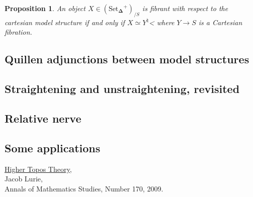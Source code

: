 \documentclass{amsart}
\newcommand{\8}{\ensuremath{\infty}}
\newcommand{\SSet}{\ensuremath{\text{Set}_{\boldsymbol{\Delta}}}}
\newtheorem{proposition}{Proposition}
\begin{document}
\begin{proposition}
  An object $X\in(\SSet^+)_{/S}$ is fibrant with respect to the cartesian model structure if and only if $X\simeq Y^\natural$< where $Y\rightarrow S$ is a Cartesian fibration.
\end{proposition}

\subsection{Quillen adjunctions between model structures}
\subsection{Straightening and unstraightening, revisited}
\subsection{Relative nerve}
\subsection{Some applications}


\begin{thebibliography}{99}
  \href{https://arxiv.org/abs/math/0608040}{Higher Topos Theory}, \\
  Jacob Lurie, \\
  Annals of Mathematics Studies, Number 170, 2009.
\end{thebibliography}
\end{document}
